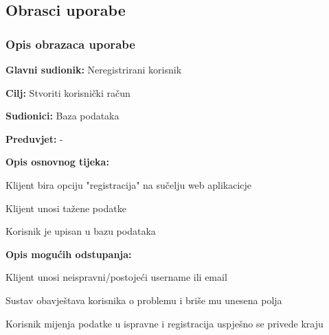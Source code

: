 			
				
			\subsection{Obrasci uporabe}
				
				\subsubsection{Opis obrazaca uporabe}
					

					\noindent {}
					\begin{packed_item}
	
						\item \textbf{Glavni sudionik: }Neregistrirani korisnik
						\item  \textbf{Cilj:} Stvoriti korisnički račun
						\item  \textbf{Sudionici:} Baza podataka
						\item  \textbf{Preduvjet:} -
						\item  \textbf{Opis osnovnog tijeka:}
						
						\item[] \begin{packed_enum}
	
							\item Klijent bira opciju "registracija" na sučelju web aplikacicje
							\item Klijent unosi tažene podatke
							\item Korisnik je upisan u bazu podataka
						\end{packed_enum}
						
						\item  \textbf{Opis mogućih odstupanja:}
						
						\item[] \begin{packed_item}
	
							\item[2.a] Klijent unosi neispravni/postojeći username ili email
							\item[] \begin{packed_enum}
								
								\item Sustav obavještava korisnika o problemu i briše mu unesena polja
								
								\item Korisnik mijenja podatke u ispravne i registracija uspješno se privede kraju
								
							\end{packed_enum}
							
						\end{packed_item}
					\end{packed_item}
					
